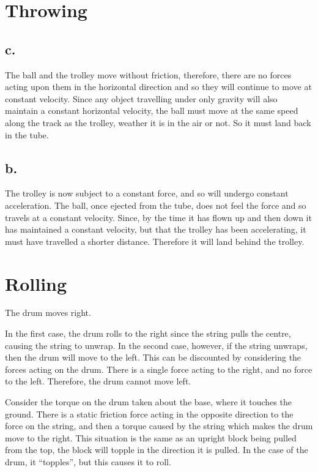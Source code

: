 \section{Throwing} %
	\label{sec:throwing_ans}

	\subsection{c.} %
		\label{sub:1}
		The ball and the trolley move without friction, therefore, there are no forces acting upon them in the horizontal direction and so they will continue to move at constant velocity. Since any object travelling under only gravity will also maintain a constant horizontal velocity, the ball must move at the same speed along the track as the trolley, weather it is in the air or not. So it must land back in the tube.
	\subsection{b.} %
		\label{sub:2}
		The trolley is now subject to a constant force, and so will undergo constant acceleration. The ball, once ejected from the tube, does not feel the force and so travels at a constant velocity. Since, by the time it has flown up and then down it has maintained a constant velocity, but that the trolley has been accelerating, it must have travelled a shorter distance. Therefore it will land behind the trolley.
	\subsection{} %
		\label{sub:3}
		

\section{Rolling} %
	\label{sec:rolling_ans}
	The drum moves right.

	In the first case, the drum rolls to the right since the string pulls the centre, causing the string to unwrap. In the second case, however, if the string unwraps, then the drum will move to the left. This can be discounted by considering the forces acting on the drum. There is a single force acting to the right, and no force to the left. Therefore, the drum cannot move left.

	Consider the torque on the drum taken about the base, where it touches the ground. There is a static friction force acting in the opposite direction to the force on the string, and then a torque caused by the string which makes the drum move to the right. This situation is the same as an upright block being pulled from the top, the block will topple in the direction it is pulled. In the case of the drum, it ``topples'', but this causes it to roll.

